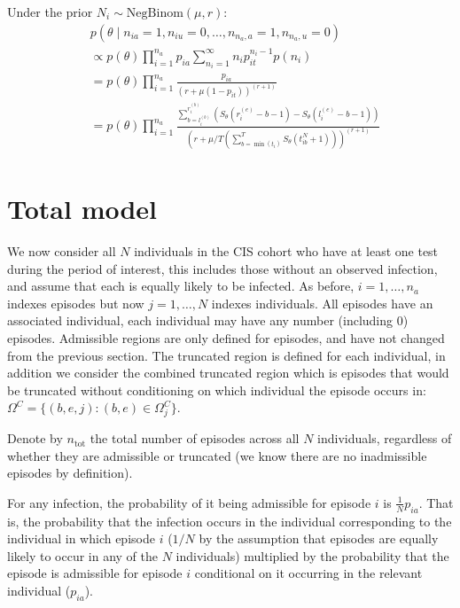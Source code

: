 \documentclass[main.tex]{subfiles}
\begin{document}
Under the prior $N_i \sim \text{NegBinom}(\mu, r)$:
\begin{align}
&p(\theta \mid n_{ia} = 1, n_{iu} = 0, \dots, n_{n_a,a} = 1, n_{n_a,u} = 0) \\
&\propto p(\theta) \prod_{i=1}^{n_a} p_{ia} \sum_{n_i=1}^\infty n_i p_{it}^{n_i- 1} p(n_i) \\
&= p(\theta) \prod_{i=1}^{n_a} \frac{p_{ia}}{(r+\mu (1-p_{it}))^{(r+1)}} \\
&= p(\theta) \prod_{i=1}^{n_a} \frac{\sum_{b=l_i^{(b)}}^{r_i^{(b)}} \left( S_\theta(r_i^{(e)} - b - 1) - S_\theta(l_i^{(e)} - b - 1) \right)}{\left( r+\mu/T \left( \sum_{b=\min(t_i)}^T S_\theta(t_{ib}^N + 1) \right) \right)^{(r+1)}} \\
\end{align}

\section{Total model}\label{total-model}

We now consider all $N$ individuals in the CIS cohort who have at
least one test during the period of interest, this includes those
without an observed infection, and assume that each is equally likely to
be infected. As before, $i = 1, \dots, n_a$ indexes episodes but now
$j = 1, \dots, N$ indexes individuals. All episodes have an associated
individual, each individual may have any number (including 0) episodes.
Admissible regions are only defined for episodes, and have not changed
from the previous section. The truncated region is defined for each
individual, in addition we consider the combined truncated region which
is episodes that would be truncated without conditioning on which
individual the episode occurs in:
$\Omega^C = \{ (b, e, j) : (b, e) \in \Omega_j^C \}$.

Denote by $n_\text{tot}$ the total number of episodes across all $N$
individuals, regardless of whether they are admissible or truncated (we
know there are no inadmissible episodes by definition).

For any infection, the probability of it being admissible for episode
$i$ is $\frac{1}{N} p_{ia}$. That is, the probability that the
infection occurs in the individual corresponding to the individual in
which episode $i$ ($1/N$ by the assumption that episodes are equally
likely to occur in any of the $N$ individuals) multiplied by the
probability that the episode is admissible for episode $i$ conditional
on it occurring in the relevant individual ($p_{ia}$).
\end{document}
